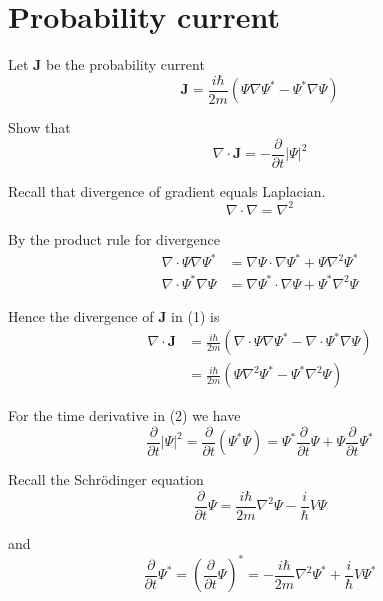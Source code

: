 

\section*{Probability current}

Let $\mathbf J$ be the probability current
\begin{equation*}
\mathbf J=\frac{i\hbar}{2m}\left(\Psi\nabla\Psi^*-\Psi^*\nabla\Psi\right)
\tag{1}
\end{equation*}

Show that
\begin{equation*}
\nabla\cdot\mathbf J=-\frac{\partial}{\partial t}|\Psi|^2
\tag{2}
\end{equation*}

Recall that divergence of gradient equals Laplacian.
\begin{equation*}
\nabla\cdot\nabla=\nabla^2
\end{equation*}

By the product rule for divergence
\begin{align*}
\nabla\cdot\Psi\nabla\Psi^*&=\nabla\Psi\cdot\nabla\Psi^*+\Psi\nabla^2\Psi^*
\\
\nabla\cdot\Psi^*\nabla\Psi&=\nabla\Psi^*\cdot\nabla\Psi+\Psi^*\nabla^2\Psi
\end{align*}

Hence the divergence of $\mathbf J$ in (1) is
\begin{align*}
\nabla\cdot\mathbf J
&=\frac{i\hbar}{2m}\left(\nabla\cdot\Psi\nabla\Psi^*-\nabla\cdot\Psi^*\nabla\Psi\right)
\\
&=\frac{i\hbar}{2m}\left(\Psi\nabla^2\Psi^*-\Psi^*\nabla^2\Psi\right)
\tag{3}
\end{align*}

For the time derivative in (2) we have
\begin{equation*}
\frac{\partial}{\partial t}|\Psi|^2
=\frac{\partial}{\partial t}(\Psi^*\Psi)
=\Psi^*\frac{\partial}{\partial t}\Psi+\Psi\frac{\partial}{\partial t}\Psi^*
\tag{4}
\end{equation*}

Recall the Schr\"odinger equation
\begin{equation*}
\frac{\partial}{\partial t}\Psi
=\frac{i\hbar}{2m}\nabla^2\Psi-\frac{i}{\hbar}V\Psi
\end{equation*}

and
\begin{equation*}
\frac{\partial}{\partial t}\Psi^*=\left(\frac{\partial}{\partial t}\Psi\right)^*
=-\frac{i\hbar}{2m}\nabla^2\Psi^*+\frac{i}{\hbar}V\Psi^*
\end{equation*}

